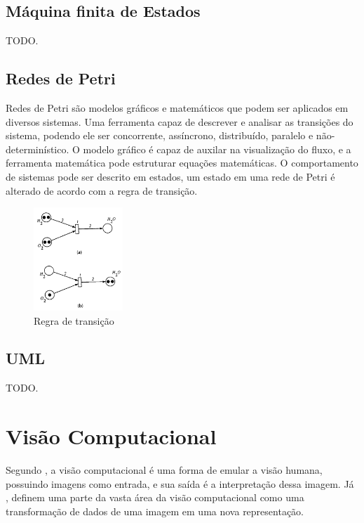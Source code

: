 \subsection{Máquina finita de Estados}
TODO.


\subsection{Redes de Petri}
Redes de Petri são modelos gráficos e matemáticos que podem ser aplicados em diversos sistemas. Uma ferramenta capaz de descrever e analisar as transições do sistema, podendo ele ser concorrente, assíncrono, distribuído, paralelo e não-determinístico. O modelo gráfico é capaz de auxilar na visualização do fluxo, e a ferramenta matemática pode estruturar equações matemáticas. O comportamento de sistemas pode ser descrito em estados, um estado em uma rede de Petri é alterado de acordo com a regra de transição. \cite{murata:1989}
 
 \begin{figure}[H]
	\centering
    	\caption{\label{fig:petri}Regra de transição}
		\includegraphics[width = 0.3\textwidth]	{resources/petri}
\end{figure}

\subsection{UML}
TODO.


\section{Visão Computacional}
Segundo , a visão computacional é uma forma de emular a visão humana, possuindo imagens como entrada, e sua saída é a interpretação dessa imagem.
Já , definem uma parte da vasta área da visão computacional como uma transformação de dados de uma imagem em uma nova representação.

